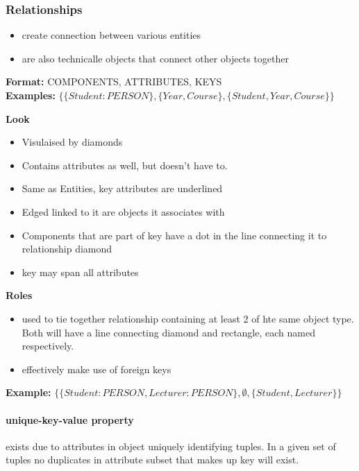 \documentclass{article}
\newcommand\tab[1][0.5cm]{\hspace*{#1}}
\begin{document}
		\subsubsection{Relationships}
			\begin{itemize}
				\item create connection between various entities
				\item are also technicalle objects that connect other objects together
			\end{itemize}

			\tab \textbf{Format:} {COMPONENTS, ATTRIBUTES, KEYS}
			\\ \tab \tab \textbf{Examples:} $\{\{Student:PERSON\},\{Year, Course\}, \{Student, Year, Course\}\}$

			\textbf{Look}
			\begin{itemize}
				\item Visulaised by diamonds
				\item Contains attributes as well, but doesn't have to.
				\item Same as Entities, key attributes are underlined
				\item Edged linked to it are objects it associates with
				\item Components that are part of key have a dot in the line connecting it to relationship diamond
				\item key may span all attributes
			\end{itemize}

			\textbf{Roles}
			\begin{itemize}
				\item used to tie together relationship containing at least 2 of hte same object type. Both will have a line connecting diamond and rectangle, each named respectively.
				\item effectively make use of foreign keys
			\end{itemize}
			\tab \textbf{Example:} $\{\{Student:PERSON, Lecturer:PERSON\},\emptyset, \{Student, Lecturer\}\}$

		\paragraph{unique-key-value property} exists due to attributes in object uniquely identifying tuples. In a given set of tuples no duplicates in attribute subset that makes up key will exist.
\end{document}

